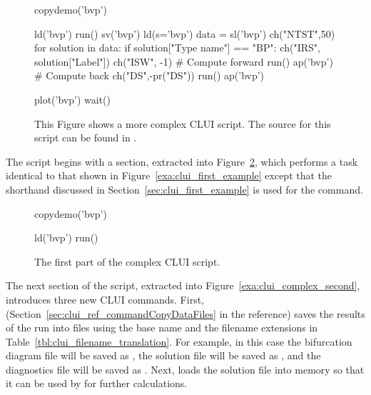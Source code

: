 \documentclass[12pt]{report}
\begin{document}
 \begin{figure}[htbp]
 {\small \begin{center} \begin{boxedverbatim}
 copydemo('bvp')

 ld('bvp')
 run()
 sv('bvp')
 ld(s='bvp')
 data = sl('bvp')
 ch("NTST",50)
 for solution in data:
     if solution["Type name"] == "BP":
         ch("IRS", solution["Label"])
         ch("ISW", -1)
         # Compute forward
         run()
         ap('bvp')
         # Compute back
         ch("DS",-pr("DS"))
         run()
         ap('bvp')

 plot('bvp')
 wait()
 \end{boxedverbatim}
 \end{center} 
 }
 \caption[A complex example of a \AUTO CLUI script.]
 {This Figure shows a more complex \AUTO CLUI script.
 The source for this script can be found in .
 }
 \label{exa:clui_complex_script}
 \end{figure}

 The script begins with a section, extracted into 
 Figure~\ref{exa:clui_complex_first}, which performs a task 
 identical to that shown in Figure~\ref{exa:clui_first_example}
 except that the shorthand discussed in 
 Section~\ref{sec:clui_first_example} is used for the 
  command.

 \begin{figure}[htbp]
 {\small \begin{center} \begin{boxedverbatim}
 copydemo('bvp')

 ld('bvp')
 run()
 \end{boxedverbatim}
 \end{center} 
 }
 \caption[The first part of the  complex \AUTO CLUI script.]
 {The first part of the  complex \AUTO CLUI script.}
 \label{exa:clui_complex_first}
 \end{figure}

 The next section of the script, extracted into 
 Figure~\ref{exa:clui_complex_second}, introduces
 three new \AUTO CLUI commands.  First, 
 (Section~\ref{sec:clui_ref_commandCopyDataFiles} in the reference)
 saves the results of the \AUTO run into files using
 the base name  and the filename extensions in
 Table~\ref{tbl:clui_filename_translation}.  For example,
 in this case the bifurcation diagram file 
 will be saved as , 
 the solution file 
 will be saved as , and  
 the diagnostics file 
 will be saved as .  Next, 
 loads the solution file  into memory
 so that it can be used by \AUTO for further calculations.
\end{document}
